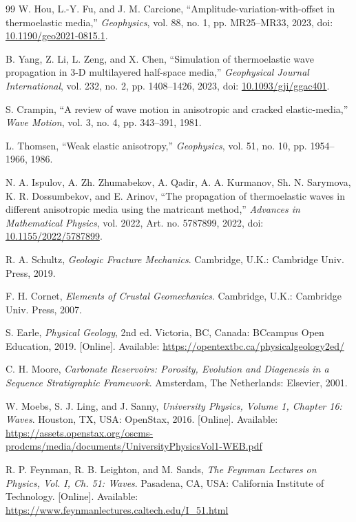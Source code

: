 \begin{thebibliography}{99}
W. Hou, L.-Y. Fu, and J. M. Carcione,
``Amplitude-variation-with-offset in thermoelastic media,''
\textit{Geophysics}, vol. 88, no. 1, pp. MR25--MR33, 2023, doi: \href{https://doi.org/10.1190/geo2021-0815.1}{10.1190/geo2021-0815.1}.

B. Yang, Z. Li, L. Zeng, and X. Chen,
``Simulation of thermoelastic wave propagation in 3-D multilayered half-space media,''
\textit{Geophysical Journal International}, vol. 232, no. 2, pp. 1408--1426, 2023, doi: \href{https://doi.org/10.1093/gji/ggac401}{10.1093/gji/ggac401}.

S. Crampin,
``A review of wave motion in anisotropic and cracked elastic-media,''
\textit{Wave Motion}, vol. 3, no. 4, pp. 343--391, 1981.

L. Thomsen,
``Weak elastic anisotropy,''
\textit{Geophysics}, vol. 51, no. 10, pp. 1954--1966, 1986.

N. A. Ispulov, A. Zh. Zhumabekov, A. Qadir, A. A. Kurmanov, Sh. N. Sarymova, K. R. Dossumbekov, and E. Arinov,
``The propagation of thermoelastic waves in different anisotropic media using the matricant method,''
\textit{Advances in Mathematical Physics}, vol. 2022, Art. no. 5787899, 2022, doi: \href{https://doi.org/10.1155/2022/5787899}{10.1155/2022/5787899}.

R. A. Schultz,
\textit{Geologic Fracture Mechanics}.
Cambridge, U.K.: Cambridge Univ. Press, 2019.

F. H. Cornet,
\textit{Elements of Crustal Geomechanics}.
Cambridge, U.K.: Cambridge Univ. Press, 2007.

S. Earle,
\textit{Physical Geology}, 2nd ed.
Victoria, BC, Canada: BCcampus Open Education, 2019. [Online]. Available: \url{https://opentextbc.ca/physicalgeology2ed/}

C. H. Moore,
\textit{Carbonate Reservoirs: Porosity, Evolution and Diagenesis in a Sequence Stratigraphic Framework}.
Amsterdam, The Netherlands: Elsevier, 2001.

W. Moebs, S. J. Ling, and J. Sanny,
\textit{University Physics, Volume 1, Chapter 16: Waves}.
Houston, TX, USA: OpenStax, 2016. [Online]. Available: \url{https://assets.openstax.org/oscms-prodcms/media/documents/UniversityPhysicsVol1-WEB.pdf}

R. P. Feynman, R. B. Leighton, and M. Sands,
\textit{The Feynman Lectures on Physics, Vol. I, Ch. 51: Waves}.
Pasadena, CA, USA: California Institute of Technology. [Online]. Available: \url{https://www.feynmanlectures.caltech.edu/I_51.html}


\end{thebibliography}
